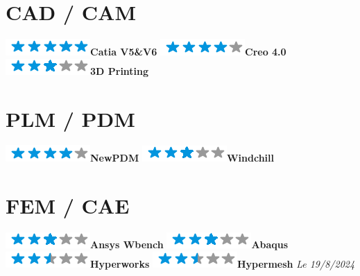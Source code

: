 \documentclass[]{friggeri-cv}
\begin{document}
\begin{aside}
\section{CAD / CAM}
\includegraphics[scale=0.40]{res/img/5stars.png}\hspace{1.5mm}\textbf{Catia V5\&V6}
\includegraphics[scale=0.40]{res/img/4stars.png}\hspace{1.5mm}\textbf{Creo 4.0}
\includegraphics[scale=0.40]{res/img/3stars.png}\hspace{1.5mm}\textbf{3D Printing}\section{PLM / PDM}
\includegraphics[scale=0.40]{res/img/4stars.png}\hspace{1.5mm}\textbf{NewPDM}
\includegraphics[scale=0.40]{res/img/3stars.png}\hspace{1.5mm}\textbf{Windchill}\section{FEM / CAE}
\includegraphics[scale=0.40]{res/img/3stars.png}\hspace{1.5mm}\textbf{Ansys Wbench}
\includegraphics[scale=0.40]{res/img/3stars.png}\hspace{1.5mm}\textbf{Abaqus}
\includegraphics[scale=0.40]{res/img/2-5stars.png}\hspace{1.5mm}\textbf{Hyperworks}
\includegraphics[scale=0.40]{res/img/2-5stars.png}\hspace{1.5mm}\textbf{Hypermesh}
\vspace{2.5mm}%
	\emph{Le 19/8/2024} \hspace*{8mm}
\end{aside}
\end{document}
